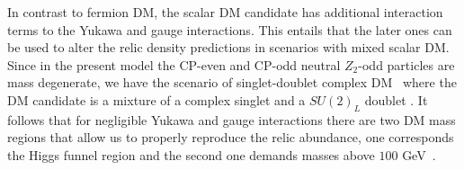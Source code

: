 \documentclass[12pt]{article}
\begin{document}
In contrast to fermion DM, the scalar DM candidate has additional interaction terms to the Yukawa and gauge interactions. This entails that the later ones can be used to alter the relic density predictions in scenarios with mixed scalar DM. Since in the present model the CP-even and CP-odd neutral $Z_2$-odd particles are mass degenerate, we have the scenario of singlet-doublet complex DM~\cite{Kadastik:2009dj,Belanger:2012vp} where the DM candidate is a mixture of a complex singlet \cite{McDonald:1993ex} and a $SU(2)_L$ doublet \cite{Deshpande:1977rw,Barbieri:2006dq}. It follows that for negligible Yukawa and gauge interactions there are two DM mass regions that allow us to properly reproduce the relic abundance, one corresponds the Higgs funnel region and the second one demands masses above $100$ GeV~\cite{Kakizaki:2016dza}. 




\end{document}
